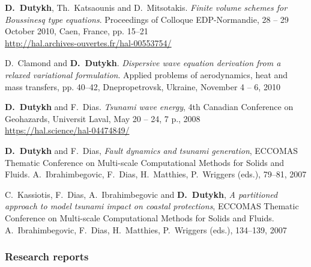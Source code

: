 \documentclass[final, a4paper, oneside, 12pt]{article}
\numberwithin{equation}{section}
\begin{document}
\begin{etaremune}

  
  \item \textbf{D.~Dutykh}, Th.~Katsaounis and D.~Mitsotakis. \textit{Finite volume schemes for Boussinesq type equations}. Proceedings of Colloque EDP-Normandie, 28 -- 29 October 2010, Caen, France, pp. 15--21 \\ %
  \url{http://hal.archives-ouvertes.fr/hal-00553754/}

  \item D.~Clamond and \textbf{D.~Dutykh}. \textit{Dispersive wave equation derivation from a relaxed variational formulation}. Applied problems of aerodynamics, heat and mass transfers, pp. 40--42, Dnepropetrovsk, Ukraine, November 4 -- 6, 2010 %
  


  \item \textbf{D.~Dutykh} and F.~Dias. \textit{Tsunami wave energy}, 4th Canadian Conference on Geohazards, Universit Laval, May 20 -- 24, 7 p., 2008 \\ %
  \url{https://hal.science/hal-04474849/}
  


  \item \textbf{D.~Dutykh} and F.~Dias, \textit{Fault dynamics and tsunami generation}, ECCOMAS Thematic Conference on Multi-scale Computational Methods for Solids and Fluids. A.~Ibrahimbegovic, F.~Dias, H.~Matthies, P.~Wriggers (eds.), 79--81, 2007 %

  \item C.~Kassiotis, F.~Dias, A.~Ibrahimbegovic and \textbf{D.~Dutykh}, \textit{A partitioned approach to model tsunami impact on coastal protections}, ECCOMAS Thematic Conference on Multi-scale Computational Methods for Solids and Fluids. A.~Ibrahimbegovic, F.~Dias, H.~Matthies, P.~Wriggers (eds.), 134--139, 2007 %
  
\end{etaremune}

\subsubsection{Research reports}
\end{document}
